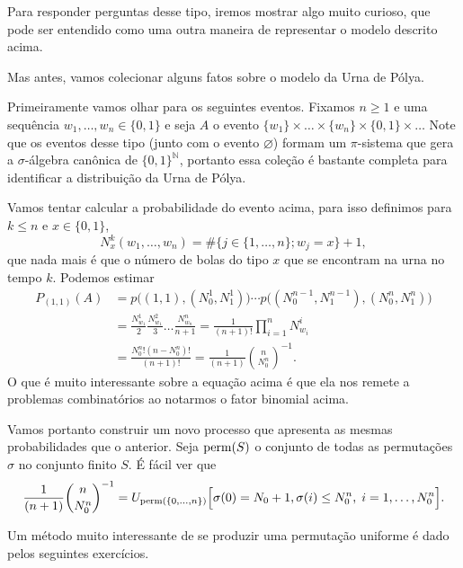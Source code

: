 \begin{topics}
Para responder perguntas desse tipo, iremos mostrar algo muito curioso, que pode ser entendido como uma outra maneira de representar o modelo descrito acima.

Mas antes, vamos colecionar alguns fatos sobre o modelo da Urna de Pólya.

Primeiramente vamos olhar para os seguintes eventos.
Fixamos $n \geq 1$ e uma sequência $w_1, \dots, w_n \in \{0,1\}$ e seja $A$ o evento $\{w_1\} \times \dots \times \{w_n\} \times \{0,1\} \times \dots$
Note que os eventos desse tipo (junto com o evento $\varnothing$) formam um $\pi$-sistema que gera a $\sigma$-álgebra canônica de $\{0,1\}^\mathbb{N}$, portanto essa coleção é bastante completa para identificar a distribuição da Urna de Pólya.

Vamos tentar calcular a probabilidade do evento acima, para isso definimos para $k \leq n$ e $x \in \{0, 1\}$,
\begin{equation}
  N_x^k (w_1, \dots, w_n) = \# \big\{ j \in \{1, \dots, n\}; w_j = x \big\} + 1,
\end{equation}
que nada mais é que o número de bolas do tipo $x$ que se encontram na urna no tempo $k$.
Podemos estimar
\begin{equation}
  \begin{split}
    P_{(1,1)}(A) & = p\big( (1,1), (N^1_0, N^1_1) \big) \cdots p \big( (N^{n-1}_0, N^{n-1}_1), (N^n_0, N^n_1) \big)\\
    & = \frac{N^1_{w_1}}2 \frac{N^2_{w_1}}3 \dots \frac{N^n_{w_n}}{n+1} = \frac{1}{(n+1)!} \prod_{i=1}^n N^i_{w_i}\\
    & = \frac{N^n_0! (n - N^n_0)!}{(n+1)!} = \frac{1}{(n+1)} \binom{n}{N^n_0}^{-1}.
  \end{split}
\end{equation}
O que é muito interessante sobre a equação acima é que ela nos remete a problemas combinatórios ao notarmos o fator binomial acima.

Vamos portanto construir um novo processo que apresenta as mesmas probabilidades que o anterior.
Seja $\operatorname{perm}(S)$ o conjunto de todas as permutações $\sigma$ no conjunto finito $S$.
É fácil ver que
\begin{equation*}
  \frac{1}{(n+1)} \binom{n}{N^n_0}^{-1} = U_{\operatorname{perm}(\{0, \dots, n\})} \Big[ \sigma(0) = N_0 + 1, \sigma(i) \leq N^n_0, \; i = 1, \dots, N^n_0 \Big].
\end{equation*}

Um método muito interessante de se produzir uma permutação uniforme é dado pelos seguintes exercícios.


\end{topics}

